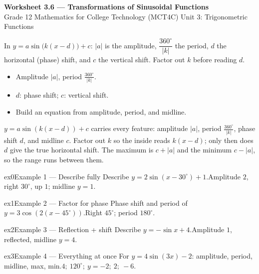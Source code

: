 \documentclass[11pt]{article}
\begin{document}
\begin{center}
{\LARGE\bfseries\color{titleblue}Worksheet 3.6 --- Transformations of Sinusoidal Functions}\\[2pt]
{\small Grade 12 Mathematics for College Technology (MCT4C) \textperiodcentered{} Unit 3: Trigonometric Functions}
\end{center}

\begin{ideabox}
In $y=a\sin\!\big(k(x-d)\big)+c$: $|a|$ is the amplitude, $\dfrac{360^\circ}{|k|}$ the period, $d$ the horizontal (phase) shift, and $c$ the vertical shift. Factor out $k$ before reading $d$.
\begin{itemize}[leftmargin=*,itemsep=2pt]
  \item Amplitude $|a|$, period $\tfrac{360^\circ}{|k|}$.
  \item $d$: phase shift; $c$: vertical shift.
  \item Build an equation from amplitude, period, and midline.
\end{itemize}
\end{ideabox}

\begin{learnbox}
$y=a\sin\!\left(k(x-d)\right)+c$ carries every feature: amplitude $|a|$, period $\tfrac{360^\circ}{|k|}$, phase shift $d$, and midline $c$.
Factor out $k$ so the inside reads $k(x-d)$; only then does $d$ give the true horizontal shift.
The maximum is $c+|a|$ and the minimum $c-|a|$, so the range runs between them.
\end{learnbox}


\begin{example}{ex0}{Example 1 --- Describe fully}
Describe $y=2\sin(x-30^\circ)+1$.\soln Amplitude $2$, right $30^\circ$, up $1$; midline $y=1$.
\end{example}

\begin{example}{ex1}{Example 2 --- Factor for phase}
Phase shift and period of $y=3\cos(2(x-45^\circ))$.\soln Right $45^\circ$; period $180^\circ$.
\end{example}

\begin{example}{ex2}{Example 3 --- Reflection + shift}
Describe $y=-\sin x+4$.\soln Amplitude $1$, reflected, midline $y=4$.
\end{example}

\begin{example}{ex3}{Example 4 --- Everything at once}
For $y=4\sin(3x)-2$: amplitude, period, midline, max, min.\soln $4;\ 120^\circ;\ y=-2;\ 2;\ -6$.
\end{example}
\end{document}
